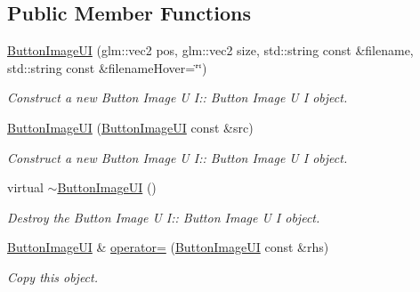 \subsection*{Public Member Functions}
\begin{DoxyCompactItemize}
\item 
\hyperlink{class_button_image_u_i_a7410aec54c74f6aa027825fc75a2c328}{Button\+Image\+UI} (glm\+::vec2 pos, glm\+::vec2 size, std\+::string const \&filename, std\+::string const \&filename\+Hover=\char`\"{}\char`\"{})
\begin{DoxyCompactList}\small\item\em Construct a new Button Image U I\+:\+: Button Image U I object. \end{DoxyCompactList}\item 
\hyperlink{class_button_image_u_i_abeb26451e576873e82b443944e241616}{Button\+Image\+UI} (\hyperlink{class_button_image_u_i}{Button\+Image\+UI} const \&src)
\begin{DoxyCompactList}\small\item\em Construct a new Button Image U I\+:\+: Button Image U I object. \end{DoxyCompactList}\item 
\mbox{\label{class_button_image_u_i_aab30f4cb991a1641922855782c6c7964}} 
virtual \hyperlink{class_button_image_u_i_aab30f4cb991a1641922855782c6c7964}{$\sim$\+Button\+Image\+UI} ()
\begin{DoxyCompactList}\small\item\em Destroy the Button Image U I\+:\+: Button Image U I object. \end{DoxyCompactList}\item 
\hyperlink{class_button_image_u_i}{Button\+Image\+UI} \& \hyperlink{class_button_image_u_i_a1915cfb56b96a85b1c0fad64508fe9f3}{operator=} (\hyperlink{class_button_image_u_i}{Button\+Image\+UI} const \&rhs)
\begin{DoxyCompactList}\small\item\em Copy this object. \end{DoxyCompactList}\end{DoxyCompactItemize}
